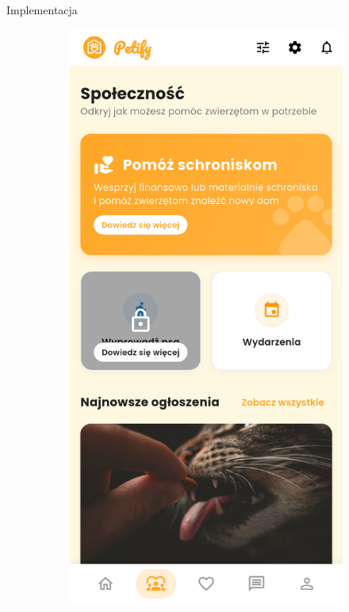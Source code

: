 \documentclass[final]{beamer} %
\begin{document}
\begin{frame}{}
\begin{columns}[T]
\begin{column}[T]{0.48\textwidth}
\begin{block}{Implementacja}
\begin{figure}[h]
\begin{subfigure}{0.325\textwidth}
    \includegraphics[width=\textwidth]{app-feed.png}
\end{subfigure}
\begin{subfigure}{0.325\textwidth}

\end{subfigure}
\end{figure}
\end{block}
\end{column}
\end{columns}
\end{frame}
\end{document}
